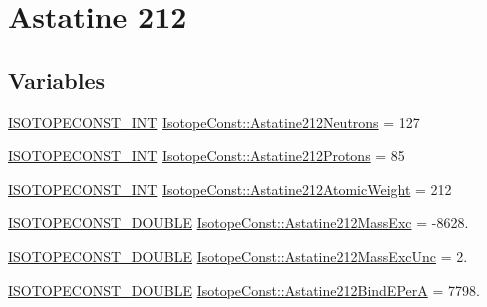 \hypertarget{group___isotope_const-_astatine-_at212}{}\section{Astatine 212}
\label{group___isotope_const-_astatine-_at212}
\subsection*{Variables}
\begin{DoxyCompactItemize}
\item 
\mbox{\hyperlink{group___isotope_const-_macros_ga5f18360b3e99483a35c32d789e62621c}{I\+S\+O\+T\+O\+P\+E\+C\+O\+N\+S\+T\+\_\+\+I\+NT}} \mbox{\hyperlink{group___isotope_const-_astatine-_at212_ga3e71d07a7f890d4bd052675a0b18d9ff}{Isotope\+Const\+::\+Astatine212\+Neutrons}} = 127
\item 
\mbox{\hyperlink{group___isotope_const-_macros_ga5f18360b3e99483a35c32d789e62621c}{I\+S\+O\+T\+O\+P\+E\+C\+O\+N\+S\+T\+\_\+\+I\+NT}} \mbox{\hyperlink{group___isotope_const-_astatine-_at212_ga1ae1e6468481020fd5b8f86b45213061}{Isotope\+Const\+::\+Astatine212\+Protons}} = 85
\item 
\mbox{\hyperlink{group___isotope_const-_macros_ga5f18360b3e99483a35c32d789e62621c}{I\+S\+O\+T\+O\+P\+E\+C\+O\+N\+S\+T\+\_\+\+I\+NT}} \mbox{\hyperlink{group___isotope_const-_astatine-_at212_ga0ab544751d74b134bbf294eaa13c63f8}{Isotope\+Const\+::\+Astatine212\+Atomic\+Weight}} = 212
\item 
\mbox{\hyperlink{group___isotope_const-_macros_ga8f45a7272ce02c0b4c65c44636ed719a}{I\+S\+O\+T\+O\+P\+E\+C\+O\+N\+S\+T\+\_\+\+D\+O\+U\+B\+LE}} \mbox{\hyperlink{group___isotope_const-_astatine-_at212_ga12563c7bf32aae0695e58f2c5f053d52}{Isotope\+Const\+::\+Astatine212\+Mass\+Exc}} = -\/8628.
\item 
\mbox{\hyperlink{group___isotope_const-_macros_ga8f45a7272ce02c0b4c65c44636ed719a}{I\+S\+O\+T\+O\+P\+E\+C\+O\+N\+S\+T\+\_\+\+D\+O\+U\+B\+LE}} \mbox{\hyperlink{group___isotope_const-_astatine-_at212_gaaabab985801269f0cd296e2c8d237154}{Isotope\+Const\+::\+Astatine212\+Mass\+Exc\+Unc}} = 2.
\item 
\mbox{\hyperlink{group___isotope_const-_macros_ga8f45a7272ce02c0b4c65c44636ed719a}{I\+S\+O\+T\+O\+P\+E\+C\+O\+N\+S\+T\+\_\+\+D\+O\+U\+B\+LE}} \mbox{\hyperlink{group___isotope_const-_astatine-_at212_ga830c16b06c0991e457f31eb22489c7f0}{Isotope\+Const\+::\+Astatine212\+Bind\+E\+PerA}} = 7798.
\item 

\end{DoxyCompactItemize}
